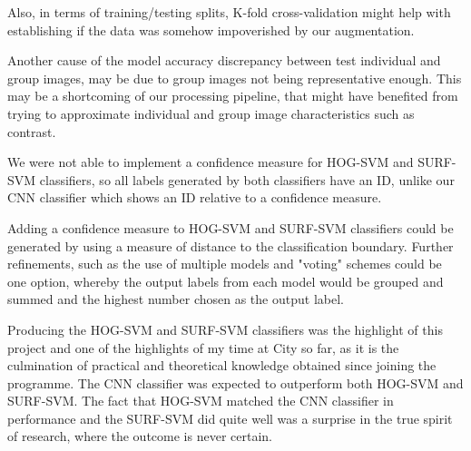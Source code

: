 Also, in terms of training/testing splits, K-fold cross-validation might help with establishing if the data was somehow impoverished by our augmentation.

Another cause of the model accuracy discrepancy between test individual and group images, may be due to group images not being representative enough. This may be a shortcoming of our processing pipeline, that might have benefited from trying to approximate individual and group image characteristics such as contrast.

We were not able to implement a confidence measure for HOG-SVM and SURF-SVM classifiers, so all labels generated by both classifiers have an ID, unlike our CNN classifier which shows an ID relative to a confidence measure.

Adding a confidence measure to HOG-SVM and SURF-SVM classifiers could be generated by using a measure of distance to the classification boundary. Further refinements, such as the use of multiple models and "voting" schemes could be one option, whereby the output labels from each model would be grouped and summed and the highest number chosen as the output label.

Producing the HOG-SVM and SURF-SVM classifiers was the highlight of this project and one of the highlights of my time at City so far, as it is the culmination of practical and theoretical knowledge obtained since joining the programme. The CNN classifier was expected to outperform both HOG-SVM and SURF-SVM. The fact that HOG-SVM matched the CNN classifier in performance and the SURF-SVM did quite well was a surprise in the true spirit of research, where the outcome is never certain.